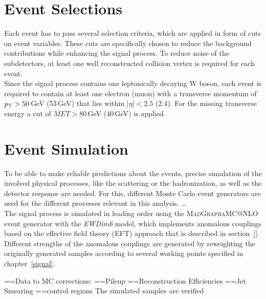 \section{Event Selections}
\label{sec:eventselection}
Each event has to pass several selection criteria, which are applied in form of cuts on event variables. These cuts are specifically chosen to reduce the background contributions while enhancing the signal process. To reduce noise of the subdetectors, at least one well reconstructed collision vertex is required for each event.\\

\noindent Since the signal process contains one leptonically decaying W boson, each event is required to contain at least one electron (muon) with a transverse momentum of $p_{\rm T}>50$\,GeV (53\,GeV) that lies within $|\eta|<2.5$ (2.4). For the missing transverse energy a cut of $MET>80$\,GeV (40\,GeV) is applied. 
\section{Event Simulation}
\label{sec:MC}
To be able to make reliable predictions about the events, precise simulation of the involved physical processes, like the scattering or the hadronization, as well as the detector response are needed. For this, different Monte Carlo event generators are used for the different processes relevant in this analysis.
\dots \\
The signal process is simulated in leading order using the \textsc{MadGraph\textunderscore aMC@NLO} event generator with the \textit{EWDim6} model\cite{madgraph}, which implements anomalous couplings based on the effective field theory (EFT) approach that is described in section~\ref{}. Different strengths of the anomalous couplings are generated by reweighting the originally generated samples according to several working points specified in chapter~\ref{signal}.


=={Data to MC corrections:}
=={Pileup}
=={Reconstruction Efficiencies}
=={Jet Smearing}
=={control regions}
The simulated samples are verified 
